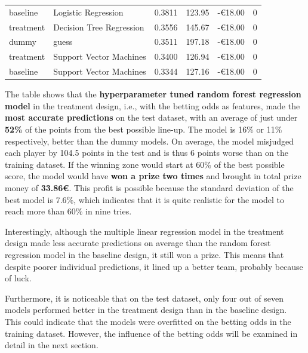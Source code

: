 \begin{table}[H]
{\begin{tabular}{@{}llccrc@{}}
    baseline    & Logistic Regression               & 0.3811 & 123.95 & -€18.00    & 0 \\
    treatment   & Decision Tree Regression          & 0.3556 & 145.67 & -€18.00    & 0 \\
    dummy       & guess                             & 0.3511 & 197.18 & -€18.00    & 0 \\
    treatment   & Support Vector Machines           & 0.3400 & 126.94 & -€18.00    & 0 \\
    baseline    & Support Vector Machines           & 0.3344 & 127.16 & -€18.00    & 0 \\\bottomrule
    \end{tabular}
    }
\end{table}

The table shows that the \textbf{hyperparameter tuned random forest regression model} in the treatment design, i.e., with the betting odds as features, made the \textbf{most accurate predictions} on the test dataset, with an average of just under \textbf{52\%} of the points from the best possible line-up. The model is 16\% or 11\% respectively, better than the dummy models. On average, the model misjudged each player by 104.5 points in the test and is thus 6 points worse than on the training dataset. If the winning zone would start at 60\% of the best possible score, the model would have \textbf{won a prize two times} and brought in total prize money of \textbf{33.86€}. This profit is possible because the standard deviation of the best model is 7.6\%, which indicates that it is quite realistic for the model to reach more than 60\% in nine tries.

Interestingly, although the multiple linear regression model in the treatment design made less accurate predictions on average than the random forest regression model in the baseline design, it still won a prize. This means that despite poorer individual predictions, it lined up a better team, probably because of luck.

Furthermore, it is noticeable that on the test dataset, only four out of seven models performed better in the treatment design than in the baseline design. This could indicate that the models were overfitted on the betting odds in the training dataset. However, the influence of the betting odds will be examined in detail in the next section.






